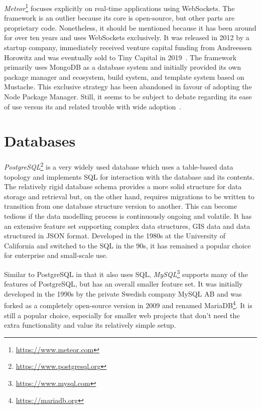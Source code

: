 \emph{Meteor}\footnote{\url{https://www.meteor.com}} focuses explicitly on real-time applications using WebSockets.
The framework is an outlier because its core is open-source, but other parts are proprietary code.
Nonetheless, it should be mentioned because it has been around for over ten years and uses WebSockets exclusively.
It was released in 2012 by a startup company, immediately received venture capital funding from Andreessen Horowitz and was eventually sold to Tiny Capital in 2019~\parencite{meteorSaleTinyCapital}.
The framework primarily uses MongoDB as a database system and initially provided its own package manager and ecosystem, build system, and template system based on Mustache.
This exclusive strategy has been abandoned in favour of adopting the Node Package Manager.
Still, it seems to be subject to debate regarding its ease of use versus its  and related trouble with wide adoption~\parencite{meteorDiscussionYCombinator}.


\section{Databases}
\label{sec:databases}



\emph{PostgreSQL}\footnote{\url{https://www.postgresql.org}} is a very widely used database which uses a table-based data topology and implements \ac{SQL} for interaction with the database and its contents.
The relatively rigid database schema provides a more solid structure for data storage and retrieval but, on the other hand, requires migrations to be written to transition from one database structure version to another.
This can become tedious if the data modelling process is continuously ongoing and volatile.
It has an extensive feature set supporting complex data structures, \ac{GIS} data and data structured in \ac{JSON} format.
Developed in the 1980s at the University of California and switched to the \ac{SQL} in the 90s, it has remained a popular choice for enterprise and small-scale use.

Similar to PostgreSQL in that it also uses \ac{SQL}, \emph{MySQL}\footnote{\url{https://www.mysql.com}} supports many of the features of PostgreSQL, but has an overall smaller feature set.
It was initially developed in the 1990s by the private Swedish company MySQL AB and was forked as a completely open-source version in 2009 and renamed MariaDB\footnote{\url{https://mariadb.org}}.
It is still a popular choice, especially for smaller web projects that don't need the extra functionality and value its relatively simple setup.

